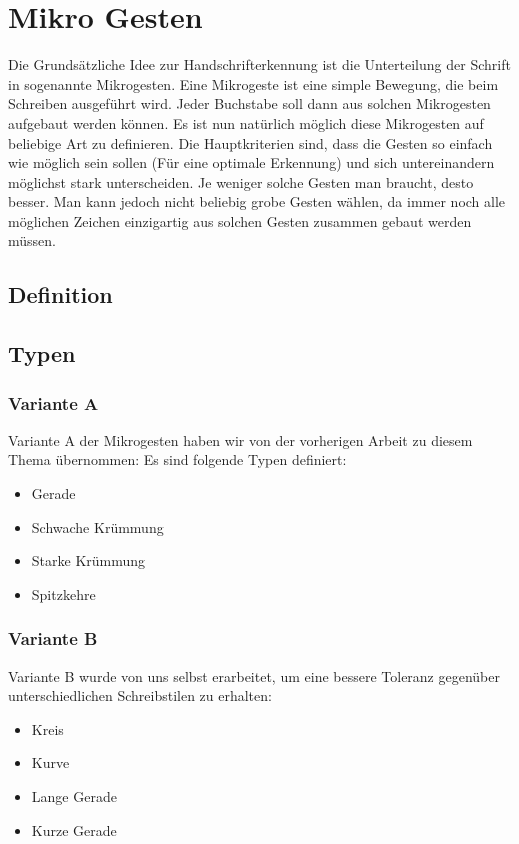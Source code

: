 \chapter{Mikro Gesten}

Die Grundsätzliche Idee zur Handschrifterkennung ist die Unterteilung der Schrift in sogenannte Mikrogesten. Eine Mikrogeste ist eine simple Bewegung, die beim Schreiben ausgeführt wird. Jeder Buchstabe soll dann aus solchen Mikrogesten aufgebaut werden können. 
Es ist nun natürlich möglich diese Mikrogesten auf beliebige Art zu definieren. Die Hauptkriterien sind, dass die Gesten so einfach wie möglich sein sollen (Für eine optimale Erkennung) und sich untereinandern möglichst stark unterscheiden. Je weniger solche Gesten man braucht, desto besser. Man kann jedoch nicht beliebig grobe Gesten wählen, da immer noch alle möglichen Zeichen einzigartig aus solchen Gesten zusammen gebaut werden müssen.


\section{Definition}

\section{Typen}
\subsection{Variante A}
Variante A der Mikrogesten haben wir von der vorherigen Arbeit zu diesem Thema übernommen: 
Es sind folgende Typen definiert:
\begin{itemize}
\item Gerade
\item Schwache Krümmung
\item Starke Krümmung
\item Spitzkehre
\end{itemize}

\subsection{Variante B}
Variante B wurde von uns selbst erarbeitet, um eine bessere Toleranz gegenüber unterschiedlichen Schreibstilen zu erhalten:\begin{itemize}
\item Kreis
\item Kurve
\item Lange Gerade
\item Kurze Gerade
\end{itemize}

